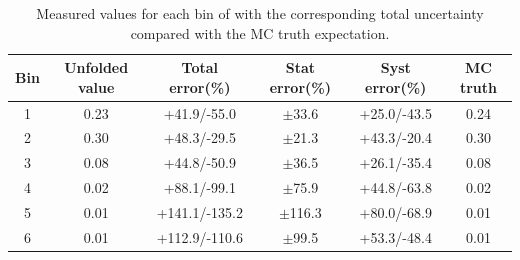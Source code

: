\begin{table}[htb]
\caption{Measured values for each bin of \pth with the corresponding total uncertainty compared with the MC truth expectation.}\label{table:results_preunf}
\centering
\begin{tabular}{c|ccccc}
Bin & Unfolded value & Total error(\%) & Stat error(\%) & Syst error(\%) & MC truth \\ 
\hline 
\hline 
1 & 0.23 & +41.9/-55.0 & $\pm$33.6 & +25.0/-43.5  &  0.24 \\ 
2 & 0.30 & +48.3/-29.5 & $\pm$21.3 & +43.3/-20.4  &  0.30 \\ 
3 & 0.08 & +44.8/-50.9 & $\pm$36.5 & +26.1/-35.4  &  0.08 \\ 
4 & 0.02 & +88.1/-99.1 & $\pm$75.9 & +44.8/-63.8  &  0.02 \\ 
5 & 0.01 & +141.1/-135.2 & $\pm$116.3 & +80.0/-68.9  &  0.01 \\ 
6 & 0.01 & +112.9/-110.6 & $\pm$99.5 & +53.3/-48.4  &  0.01 \\ 
\hline 
\end{tabular}
\end{table}


